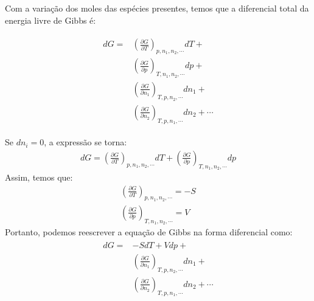 \begin{multicols*}{2}
  Com a variação dos moles das espécies presentes, temos que a diferencial total da energia livre de Gibbs é:
  \begin{definition}
    \begin{gather}
      \begin{align}
        dG = & \left( \frac{\partial G}{\partial T}  \right)_{p, n_1, n_2, \cdots} dT + \\
             & \left( \frac{\partial G}{\partial p}  \right)_{T, n_1, n_2, \cdots} dp + \\
             & \left( \frac{\partial G}{\partial n_1}  \right)_{T, p, n_2, \cdots} dn_1 + \\
             & \left( \frac{\partial G}{\partial n_2}  \right)_{T, p, n_1, \cdots} dn_2 + \cdots
      \end{align}
    \end{gather}    
  \end{definition}

  \begin{corollary}
    Se $dn_i = 0$, a expressão se torna:
    \begin{gather}
      dG = \left( \frac{\partial G}{\partial T}  \right)_{p, n_1, n_2, \cdots} dT + \left( \frac{\partial G}{\partial p}  \right)_{T, n_1, n_2, \cdots} dp
    \end{gather}
    Assim, temos que:
    \begin{gather}
      \left( \frac{\partial G}{\partial T}  \right)_{p, n_1, n_2, \cdots} = -S \\
      \left( \frac{\partial G}{\partial p}  \right)_{T, n_1, n_2, \cdots} = V
    \end{gather}
    Portanto, podemos reescrever a equação de Gibbs na forma diferencial como: 
    \begin{gather}
      \begin{align}
        dG = & -SdT + Vdp + \\
             & \left( \frac{\partial G}{\partial n_1}  \right)_{T, p, n_2, \cdots} dn_1 + \\
             & \left( \frac{\partial G}{\partial n_2}  \right)_{T, p, n_1, \cdots} dn_2 + \cdots
      \end{align}
    \end{gather}
  \end{corollary}


\end{multicols*}
